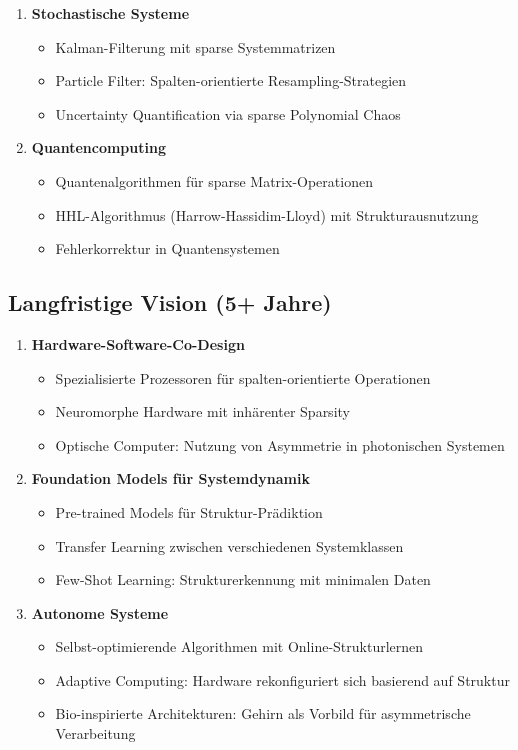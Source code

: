 \documentclass[a4paper,12pt]{report}
\theoremstyle{definition}
\begin{document}
\begin{enumerate}
		\item \textbf{Stochastische Systeme}
		\begin{itemize}
			\item Kalman-Filterung mit sparse Systemmatrizen
			\item Particle Filter: Spalten-orientierte Resampling-Strategien
			\item Uncertainty Quantification via sparse Polynomial Chaos
		\end{itemize}
		
		\item \textbf{Quantencomputing}
		\begin{itemize}
			\item Quantenalgorithmen für sparse Matrix-Operationen
			\item HHL-Algorithmus (Harrow-Hassidim-Lloyd) mit Strukturausnutzung
			\item Fehlerkorrektur in Quantensystemen
		\end{itemize}
	\end{enumerate}
	
	\subsection{Langfristige Vision (5+ Jahre)}
	
	\begin{enumerate}
		\item \textbf{Hardware-Software-Co-Design}
		\begin{itemize}
			\item Spezialisierte Prozessoren für spalten-orientierte Operationen
			\item Neuromorphe Hardware mit inhärenter Sparsity
			\item Optische Computer: Nutzung von Asymmetrie in photonischen Systemen
		\end{itemize}
		
		\item \textbf{Foundation Models für Systemdynamik}
		\begin{itemize}
			\item Pre-trained Models für Struktur-Prädiktion
			\item Transfer Learning zwischen verschiedenen Systemklassen
			\item Few-Shot Learning: Strukturerkennung mit minimalen Daten
		\end{itemize}
		
		\item \textbf{Autonome Systeme}
		\begin{itemize}
			\item Selbst-optimierende Algorithmen mit Online-Strukturlernen
			\item Adaptive Computing: Hardware rekonfiguriert sich basierend auf Struktur
			\item Bio-inspirierte Architekturen: Gehirn als Vorbild für asymmetrische Verarbeitung
		\end{itemize}
	\end{enumerate}
	
\end{document}
